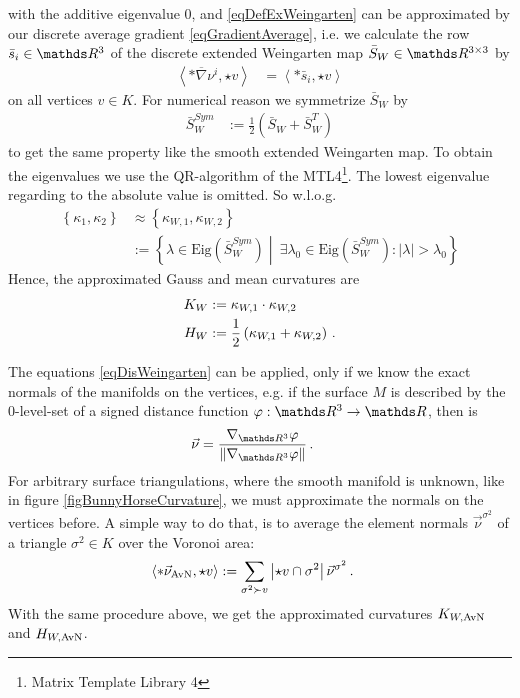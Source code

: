     with the additive eigenvalue 0,
    and \eqref{eqDefExWeingarten} can be approximated by our discrete average gradient \eqref{eqGradientAverage},
    i.e. we calculate the  row \( \bar{s}_{i}\in\R^{3} \) of the discrete extended Weingarten map \( \bar{S}_{W}\in\R^{3\times 3} \) by
    \begin{align} \label{eqDisWeingarten}
      \left\langle *\overline{\nabla}\nu^{i} , \star v \right\rangle 
        &= \left\langle *\bar{s}_{i} , \star v \right\rangle
    \end{align}
    on all vertices \( v\in K \).
    For numerical reason we symmetrize \( \bar{S}_{W} \) by
    \begin{align}
      \bar{S}_{W}^{Sym} &:= \frac{1}{2}\left( \bar{S}_{W} + \bar{S}_{W}^{T} \right)
    \end{align}
    to get the same property like the smooth extended Weingarten map.
    To obtain the eigenvalues we use the QR-algorithm of the MTL4\footnote{Matrix Template Library 4}.
    The lowest eigenvalue regarding to the absolute value is omitted.
    So w.l.o.g.
    \begin{align}
      \left\{\kappa_{1},\kappa_{2}\right\} &\approx \left\{ \kappa_{W,1}, \kappa_{W,2} \right\} \\ 
                    &:= \left\{ \lambda\in\text{Eig}(\bar{S}_{W}^{Sym}) \middle|\ \exists\lambda_{0}\in\text{Eig}(\bar{S}_{W}^{Sym}): \left| \lambda \right| > \lambda_{0} \right\} 
    \end{align}
    Hence, the approximated Gauss and mean curvatures are
    \begin{align}
      K_{W} &:= \kappa_{W,1} \cdot \kappa_{W,2} \\
      H_{W} &:= \frac{1}{2}\left( \kappa_{W,1} + \kappa_{W,2} \right) \,\text{.}
    \end{align}

    The equations \eqref{eqDisWeingarten} can be applied, only if we know the exact normals of the manifolds on the vertices, 
    e.g. if the surface \( M \) is described by the 0-level-set of a signed distance function \( \varphi:\R^{3}\rightarrow\R \),
    then is
    \begin{align}
      \vec{\nu} &= \frac{\nabla_{\R^{3}}\varphi}{\left\| \nabla_{\R^{3}}\varphi \right\|} \formpunkt
    \end{align}
    For arbitrary surface triangulations, where the smooth manifold is unknown, like in figure \ref{figBunnyHorseCurvature},
    we must approximate the normals on the vertices before.
    A simple way to do that, is to average the element normals \( \vec{\nu}^{\sigma^{2}} \) of a triangle \( \sigma^{2}\in K \)
    over the Voronoi area:
    \begin{align}
      \left\langle *\vec{\nu}_{\text{AvN}} , \star v \right\rangle
        &:= \sum_{\sigma^{2}\succ v} \left| \star v \cap \sigma^{2} \right| \vec{\nu}^{\sigma^{2}} \,\text{.}
    \end{align}
    With the same procedure above, we get the approximated curvatures \( K_{W,\text{AvN}} \) and \( H_{W,\text{AvN}} \).




